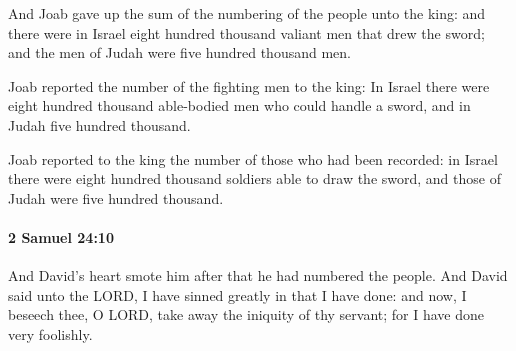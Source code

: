 			\begin{versebox}
					\item[BHS] 
					\item[ASV] And Joab gave up the sum of the numbering of the people unto the king: and there were in Israel eight hundred thousand valiant men that drew the sword; and the men of Judah were five hundred thousand men.
					\item[NIV] Joab reported the number of the fighting men to the king: In Israel there were eight hundred thousand able-bodied men who could handle a sword, and in Judah five hundred thousand.
					\item[NRSV] Joab reported to the king the number of those who had been recorded: in Israel there were eight hundred thousand soldiers able to draw the sword, and those of Judah were five hundred thousand.
			\end{versebox}

		\paragraph{2 Samuel 24:10} %
			\label{2SAMUEL-24-10}

			And David’s heart smote him after that he had numbered the people. And David said unto the LORD, I have sinned greatly in that I have done: and now, I beseech thee, O LORD, take away the iniquity of thy servant; for I have done very foolishly.

